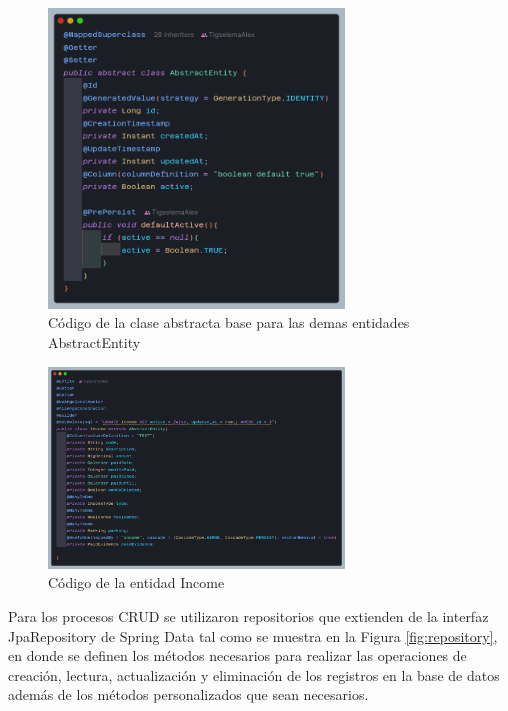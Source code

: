 \begin{figure}[H]
    \centering
    \includegraphics[width=0.7\textwidth]{resources/images/abstractEntity}
    \caption{Código de la clase abstracta base para las demas entidades AbstractEntity}
    \label{fig:abstract-entity}
\end{figure}

\begin{figure}[H]
    \centering
    \includegraphics[width=0.7\textwidth]{resources/images/entity}
    \caption{Código de la entidad Income}
    \label{fig:entity}
\end{figure}

Para los procesos CRUD se utilizaron repositorios que extienden de la interfaz JpaRepository de Spring Data  tal como se muestra en la Figura \ref{fig:repository}, en donde se definen los métodos necesarios para realizar las operaciones de creación, lectura, actualización y eliminación de los registros en la base de datos además de los métodos personalizados que sean necesarios.

